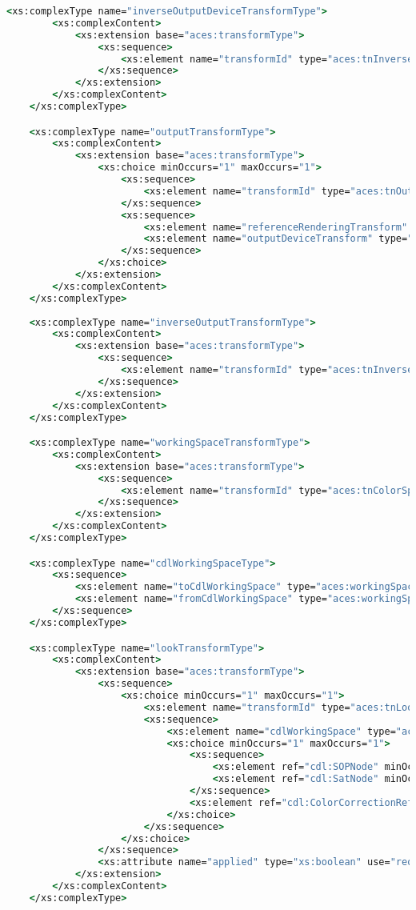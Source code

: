 \begin{lstlisting}[language=csh]
	<xs:complexType name="inverseOutputDeviceTransformType">
		<xs:complexContent>
			<xs:extension base="aces:transformType">
				<xs:sequence>
					<xs:element name="transformId" type="aces:tnInverseOutputDeviceTransform" minOccurs="1" maxOccurs="1"/>
				</xs:sequence>
			</xs:extension>
		</xs:complexContent>
	</xs:complexType>

	<xs:complexType name="outputTransformType">
		<xs:complexContent>
			<xs:extension base="aces:transformType">
				<xs:choice minOccurs="1" maxOccurs="1">
					<xs:sequence>
						<xs:element name="transformId" type="aces:tnOutputTransform" minOccurs="1" maxOccurs="1"/>
					</xs:sequence>
					<xs:sequence>
						<xs:element name="referenceRenderingTransform" type="aces:referenceRenderingTransformType" minOccurs="1" maxOccurs="1"/>
						<xs:element name="outputDeviceTransform" type="aces:outputDeviceTransformType" minOccurs="1" maxOccurs="1"/>
					</xs:sequence>
				</xs:choice>
			</xs:extension>
		</xs:complexContent>
	</xs:complexType>
	
	<xs:complexType name="inverseOutputTransformType">
		<xs:complexContent>
			<xs:extension base="aces:transformType">
				<xs:sequence>
					<xs:element name="transformId" type="aces:tnInverseOutputTransform" minOccurs="1" maxOccurs="1"/>
				</xs:sequence>
			</xs:extension>
		</xs:complexContent>
	</xs:complexType>

	<xs:complexType name="workingSpaceTransformType">
		<xs:complexContent>
			<xs:extension base="aces:transformType">
				<xs:sequence>
					<xs:element name="transformId" type="aces:tnColorSpaceConversionTransform" minOccurs="1" maxOccurs="1"/>
				</xs:sequence>
			</xs:extension>
		</xs:complexContent>
	</xs:complexType>

	<xs:complexType name="cdlWorkingSpaceType">
		<xs:sequence>
			<xs:element name="toCdlWorkingSpace" type="aces:workingSpaceTransformType" minOccurs="0" maxOccurs="1"/>
			<xs:element name="fromCdlWorkingSpace" type="aces:workingSpaceTransformType" minOccurs="1" maxOccurs="1"/>
		</xs:sequence>
	</xs:complexType>

	<xs:complexType name="lookTransformType">
		<xs:complexContent>
			<xs:extension base="aces:transformType">
				<xs:sequence>
					<xs:choice minOccurs="1" maxOccurs="1">
						<xs:element name="transformId" type="aces:tnLookTransform" minOccurs="1" maxOccurs="1"/>
						<xs:sequence>
							<xs:element name="cdlWorkingSpace" type="aces:cdlWorkingSpaceType" minOccurs="1" maxOccurs="1"/>
							<xs:choice minOccurs="1" maxOccurs="1">
								<xs:sequence>
									<xs:element ref="cdl:SOPNode" minOccurs="1" maxOccurs="1"/>
									<xs:element ref="cdl:SatNode" minOccurs="1" maxOccurs="1"/>
								</xs:sequence>
								<xs:element ref="cdl:ColorCorrectionRef"/>
							</xs:choice>
						</xs:sequence>
					</xs:choice>
				</xs:sequence>
				<xs:attribute name="applied" type="xs:boolean" use="required"/>
			</xs:extension>
		</xs:complexContent>
	</xs:complexType>


\end{lstlisting}
